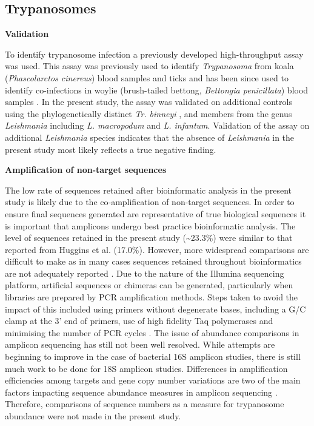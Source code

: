 \documentclass[a4paper, nobind]{templates/ociamthesis}
\begin{document}
\hypertarget{trypanosomes-2}{%
\subsection{Trypanosomes}\label{trypanosomes-2}}

\textbf{Validation}

To identify trypanosome infection a previously developed high-throughput assay was used. This assay was previously used to identify \emph{Trypanosoma} from koala (\emph{Phascolarctos cinereus}) blood samples and ticks \autocite{barbosaIncreasedGeneticDiversity2017} and has been since used to identify co-infections in woylie (brush-tailed bettong, \emph{Bettongia penicillata}) blood samples \autocite{cooperNextGenerationSequencing2018}.
In the present study, the assay was validated on additional controls using the phylogenetically distinct \emph{Tr. binneyi} \autocite{papariniNovelGenotypesTrypanosoma2014}, and members from the genus \emph{Leishmania} including \emph{L. macropodum} and \emph{L. infantum}.
Validation of the assay on additional \emph{Leishmania} species indicates that the absence of \emph{Leishmania} in the present study most likely reflects a true negative finding.

\textbf{Amplification of non-target sequences}

The low rate of sequences retained after bioinformatic analysis in the present study is likely due to the co-amplification of non-target sequences.
In order to ensure final sequences generated are representative of true biological sequences it is important that amplicons undergo best practice bioinformatic analysis.
The level of sequences retained in the present study (\textasciitilde23.3\%) were similar to that reported from Huggins et al. \autocite*{hugginsNovelMetabarcodingDiagnostic2019} (17.0\%).
However, more widespread comparisons are difficult to make as in many cases sequences retained throughout bioinformatics are not adequately reported \autocite{squarreDiversityTrypanosomesWildlife2020,wahabNovelMetabarcoded18S2020}.
Due to the nature of the Illumina sequencing platform, artificial sequences or chimeras can be generated, particularly when libraries are prepared by PCR amplification methods.
Steps taken to avoid the impact of this included using primers without degenerate bases, including a G/C clamp at the 3' end of primers, use of high fidelity Taq polymerases and minimising the number of PCR cycles \autocite{bradleyDesignEvaluationIllumina2016}.
The issue of abundance comparisons in amplicon sequencing has still not been well resolved. While attempts are beginning to improve in the case of bacterial 16S amplicon studies, there is still much work to be done for 18S amplicon studies.
Differences in amplification efficiencies among targets and gene copy number variations are two of the main factors impacting sequence abundance measures in amplicon sequencing \autocite{bradleyDesignEvaluationIllumina2016}.
Therefore, comparisons of sequence numbers as a measure for trypanosome abundance were not made in the present study.
\end{document}
